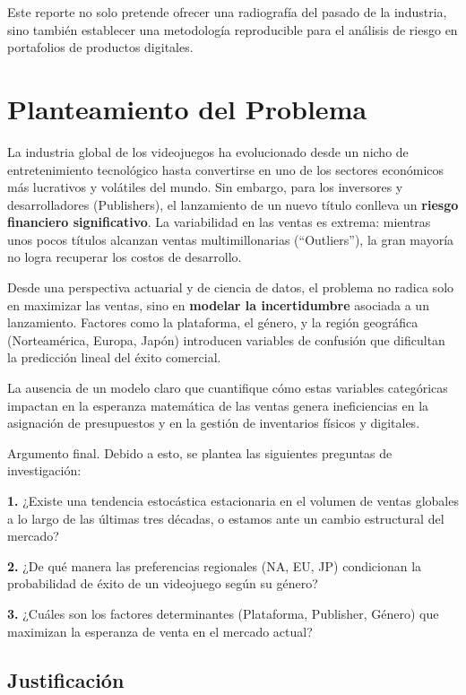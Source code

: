 \documentclass[oneside,11pt]{Latex/Classes/PhDthesisPSnPDF}
\begin{document}
Este reporte no solo pretende ofrecer una radiografía del pasado de la
industria, sino también establecer una metodología reproducible para el
análisis de riesgo en portafolios de productos digitales.

\chapter{Planteamiento del Problema}

La industria global de los videojuegos ha evolucionado desde un nicho de
entretenimiento tecnológico hasta convertirse en uno de los sectores
económicos más lucrativos y volátiles del mundo. Sin embargo, para los
inversores y desarrolladores (Publishers), el lanzamiento de un nuevo
título conlleva un \textbf{riesgo financiero significativo}. La
variabilidad en las ventas es extrema: mientras unos pocos títulos
alcanzan ventas multimillonarias (``Outliers''), la gran mayoría no
logra recuperar los costos de desarrollo.

Desde una perspectiva actuarial y de ciencia de datos, el problema no
radica solo en maximizar las ventas, sino en \textbf{modelar la
incertidumbre} asociada a un lanzamiento. Factores como la plataforma,
el género, y la región geográfica (Norteamérica, Europa, Japón)
introducen variables de confusión que dificultan la predicción lineal
del éxito comercial.

La ausencia de un modelo claro que cuantifique cómo estas variables
categóricas impactan en la esperanza matemática de las ventas genera
ineficiencias en la asignación de presupuestos y en la gestión de
inventarios físicos y digitales.

Argumento final. Debido a esto, se plantea las siguientes preguntas de
investigación:

\textbf{1.} ¿Existe una tendencia estocástica estacionaria en el volumen
de ventas globales a lo largo de las últimas tres décadas, o estamos
ante un cambio estructural del mercado?

\textbf{2.} ¿De qué manera las preferencias regionales (NA, EU, JP)
condicionan la probabilidad de éxito de un videojuego según su género?

\textbf{3.} ¿Cuáles son los factores determinantes (Plataforma,
Publisher, Género) que maximizan la esperanza de venta en el mercado
actual?

\section{Justificación}
\end{document}
